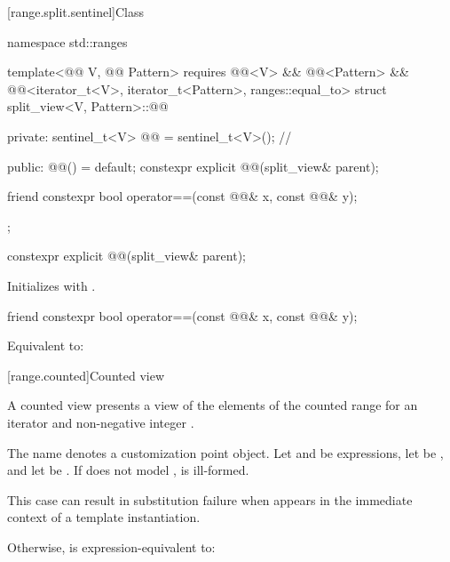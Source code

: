 [range.split.sentinel]{Class }

\begin{codeblock}
namespace std::ranges {
  template<@@ V, @@ Pattern>
    requires @@<V> && @@<Pattern> &&
             @@<iterator_t<V>, iterator_t<Pattern>, ranges::equal_to>
  struct split_view<V, Pattern>::@@ {
  private:
    sentinel_t<V> @@ = sentinel_t<V>();               // \expos

  public:
    @@() = default;
    constexpr explicit @@(split_view& parent);

    friend constexpr bool operator==(const @@& x, const @@& y);
  };
}
\end{codeblock}

\begin{itemdecl}
constexpr explicit @@(split_view& parent);
\end{itemdecl}

\begin{itemdescr}
\pnum
\effects
Initializes  with .
\end{itemdescr}

\begin{itemdecl}
friend constexpr bool operator==(const @@& x, const @@& y);
\end{itemdecl}

\begin{itemdescr}
\pnum
\effects
Equivalent to: 
\end{itemdescr}

[range.counted]{Counted view}

\pnum
{}%
A counted view presents a view of the elements
of the counted range 
for an iterator  and non-negative integer .

\pnum
{}%
The name  denotes
a customization point object.
Let  and  be expressions,
let  be , and
let  be .
If  does not model
,
 is ill-formed.
\begin{note}
This case can result in substitution failure
when 
appears in the immediate context of a template instantiation.
\end{note}
Otherwise, 
is expression-equivalent to:

